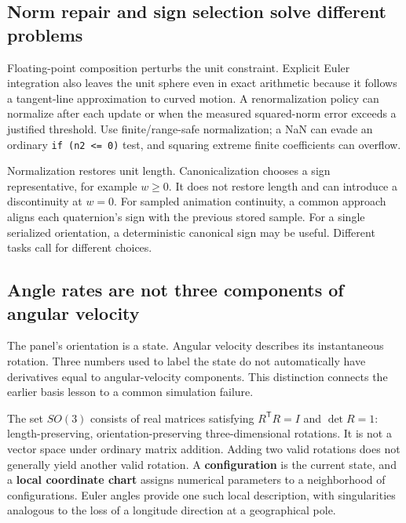 \subsection{Norm repair and sign selection solve different problems}\label{01-foundations-i-ch019-norm-repair-and-sign-selection-solve-different-problems}

Floating-point composition perturbs the unit constraint. Explicit Euler integration also leaves the unit sphere even in exact arithmetic because it follows a tangent-line approximation to curved motion. A renormalization policy can normalize after each update or when the measured squared-norm error exceeds a justified threshold. Use finite/range-safe normalization; a NaN can evade an ordinary \texttt{if\ (n2\ \textless{}=\ 0)} test, and squaring extreme finite coefficients can overflow.

Normalization restores unit length. Canonicalization chooses a sign representative, for example \(w\ge0\). It does not restore length and can introduce a discontinuity at \(w=0\). For sampled animation continuity, a common approach aligns each quaternion's sign with the previous stored sample. For a single serialized orientation, a deterministic canonical sign may be useful. Different tasks call for different choices.

\subsection{Angle rates are not three components of angular velocity}\label{01-foundations-i-ch019-angle-rates-are-not-three-components-of-angular-velocity}

The panel's orientation is a state. Angular velocity describes its instantaneous rotation. Three numbers used to label the state do not automatically have derivatives equal to angular-velocity components. This distinction connects the earlier basis lesson to a common simulation failure.

The set \(SO(3)\) consists of real matrices satisfying \(R^{\mathsf T}R=I\) and \(\det R=1\): length-preserving, orientation-preserving three-dimensional rotations. It is not a vector space under ordinary matrix addition. Adding two valid rotations does not generally yield another valid rotation. A \textbf{configuration} is the current state, and a \textbf{local coordinate chart} assigns numerical parameters to a neighborhood of configurations. Euler angles provide one such local description, with singularities analogous to the loss of a longitude direction at a geographical pole.

